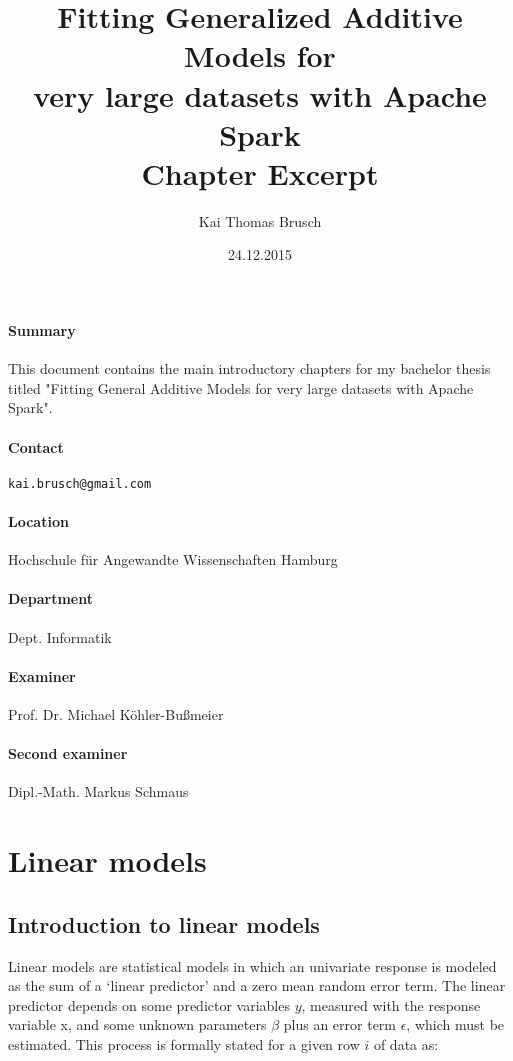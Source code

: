 \documentclass{article}
\title{
    Fitting Generalized Additive Models for\\ very large datasets with Apache Spark \\[7pt]
    \large Chapter Excerpt
}
\date{24.12.2015}
\author{Kai Thomas Brusch}
\begin{document}

    \maketitle

    \paragraph{Summary}

    This document contains the main introductory chapters for my bachelor thesis titled "Fitting General Additive Models for very large datasets with Apache Spark".

    \paragraph{Contact} \texttt{kai.brusch@gmail.com}

    \paragraph{Location} Hochschule für Angewandte Wissenschaften Hamburg
    \paragraph{Department} Dept. Informatik
    \paragraph{Examiner} Prof. Dr. Michael Köhler-Bußmeier
    \paragraph{Second examiner} Dipl.-Math. Markus Schmaus

    \newpage

    \tableofcontents

    \newpage

    \section{Linear models}

    \subsection{Introduction to linear models}
    Linear models are statistical models in which an univariate response is modeled as the sum of a ‘linear predictor’ and a zero mean random error term. The linear predictor depends on some predictor variables $y$, measured with the response variable x, and some unknown parameters $\beta$ plus an error term $\epsilon$, which must be estimated. This process is formally stated for a given row  $i$ of data as:
\end{document}
